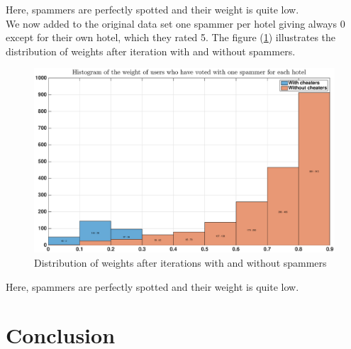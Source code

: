 \documentclass[12pt,a4paper]{article}
\begin{document}
Here, spammers are perfectly spotted and their weight is quite low.\\

We now added to the original data set one spammer per hotel giving always 0 except for their own hotel, which they rated 5. The figure (\ref{fig:hotel:not_random_each_hotel}) illustrates the distribution of weights after iteration with and without spammers.

\begin{figure}[!h]
\centering
\includegraphics[width = \textwidth]{hotels/not_random_each_hotels.eps}
\caption{\label{fig:hotel:not_random_each_hotel} Distribution of weights after iterations with and without spammers}
\end{figure}

Here, spammers are perfectly spotted and their weight is quite low.

\FloatBarrier
\section{Conclusion}



\nocite{*}
\end{document}
